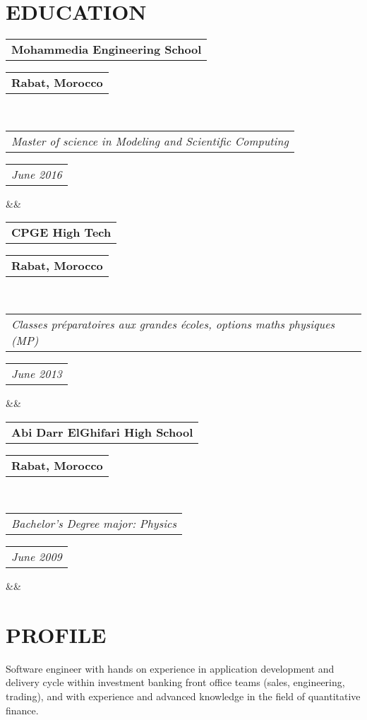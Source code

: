 \documentclass[11pt,a4paper,roman]{moderncv}        %
\makeatletter
\newcommand*{\customcventry}[7][.25em]{
  \begin{tabular}{@{}l} 
    {\bfseries #4}
  \end{tabular}
  \hfill%
  \begin{tabular}{l@{}}
     {\bfseries #5}
  \end{tabular} \\
  \begin{tabular}{@{}l} 
    {\itshape #3}
  \end{tabular}
  \hfill%
  \begin{tabular}{l@{}}
     {\itshape #2}
  \end{tabular}
  \ifx&#7&%
  \else{\\%
    \begin{minipage}{\maincolumnwidth}%
      \small#7%
    \end{minipage}}\fi%
  \par\addvspace{#1}}
\makeatother
\begin{document}
\makecvtitle
\vspace*{-23mm}

\begin{center}
\begin{tabular}{ c c c c }
\end{tabular}
\end{center}

\section{EDUCATION}
{\customcventry{June 2016}{Master of science in Modeling and Scientific Computing}{Mohammedia Engineering School}{Rabat, Morocco}{}{}}
{\customcventry{June 2013}{Classes préparatoires aux grandes écoles, options maths physiques (MP)}{CPGE High Tech}{Rabat, Morocco}{}{}}
{\customcventry{June 2009}{Bachelor's Degree major: Physics}{Abi Darr ElGhifari High School}{Rabat, Morocco}{}{}}
\section{PROFILE}
Software engineer with hands on experience in application development and delivery cycle within investment banking front office teams (sales, engineering, trading), and with experience and advanced knowledge in the field of quantitative finance.
\end{document}
